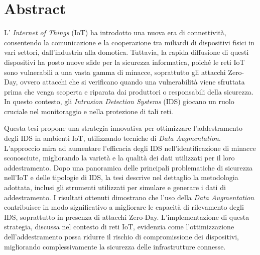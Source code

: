 \chapter{Abstract} 


L' \textit{Internet of Things} (IoT) ha introdotto una nuova era di connettività, consentendo la comunicazione e la cooperazione tra miliardi di dispositivi fisici in vari settori, dall'industria alla domotica. Tuttavia, la rapida diffusione di questi dispositivi ha posto nuove sfide per la sicurezza informatica, poiché le reti IoT sono vulnerabili a una vasta gamma di minacce, soprattutto gli attacchi Zero-Day, ovvero attacchi che si verificano quando una vulnerabilità viene sfruttata prima che venga scoperta e riparata dai produttori o responsabili della sicurezza. In questo contesto, gli \textit{Intrusion Detection Systems} (IDS) giocano un ruolo cruciale nel monitoraggio e nella protezione di tali reti.

Questa tesi propone una strategia innovativa per ottimizzare l'addestramento degli IDS in ambienti IoT, utilizzando tecniche di \textit{Data Augmentation}. L'approccio mira ad aumentare l'efficacia degli IDS nell'identificazione di minacce sconosciute, migliorando la varietà e la qualità dei dati utilizzati per il loro addestramento. Dopo una panoramica delle principali problematiche di sicurezza nell'IoT e delle tipologie di IDS, la tesi descrive nel dettaglio la metodologia adottata, inclusi gli strumenti utilizzati per simulare e generare i dati di addestramento.
I risultati ottenuti dimostrano che l'uso della \textit{Data Augmentation} contribuisce in modo significativo a migliorare le capacità di rilevamento degli IDS, soprattutto in presenza di attacchi Zero-Day. L'implementazione di questa strategia, discussa nel contesto di reti IoT, evidenzia come l'ottimizzazione dell'addestramento possa ridurre il rischio di compromissione dei dispositivi, migliorando complessivamente la sicurezza delle infrastrutture connesse.
